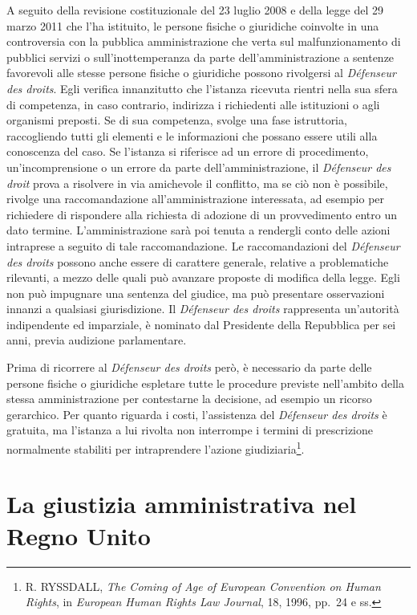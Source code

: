 \documentclass[12pt,it,a4paper,]{report}
\begin{document}
A seguito della revisione costituzionale del 23 luglio 2008 e della
legge del 29 marzo 2011 che l'ha istituito, le persone fisiche o
giuridiche coinvolte in una controversia con la pubblica amministrazione
che verta sul malfunzionamento di pubblici servizi o sull'inottemperanza
da parte dell'amministrazione a sentenze favorevoli alle stesse persone
fisiche o giuridiche possono rivolgersi al \emph{Défenseur des droits}.
Egli verifica innanzitutto che l'istanza ricevuta rientri nella sua
sfera di competenza, in caso contrario, indirizza i richiedenti alle
istituzioni o agli organismi preposti. Se di sua competenza, svolge una
fase istruttoria, raccogliendo tutti gli elementi e le informazioni che
possano essere utili alla conoscenza del caso. Se l'istanza si riferisce
ad un errore di procedimento, un'incomprensione o un errore da parte
dell'amministrazione, il \emph{Défenseur des droit} prova a risolvere in
via amichevole il conflitto, ma se ciò non è possibile, rivolge una
raccomandazione all'amministrazione interessata, ad esempio per
richiedere di rispondere alla richiesta di adozione di un provvedimento
entro un dato termine. L'amministrazione sarà poi tenuta a rendergli
conto delle azioni intraprese a seguito di tale raccomandazione. Le
raccomandazioni del \emph{Défenseur des droits} possono anche essere di
carattere generale, relative a problematiche rilevanti, a mezzo delle
quali può avanzare proposte di modifica della legge. Egli non può
impugnare una sentenza del giudice, ma può presentare osservazioni
innanzi a qualsiasi giurisdizione. Il \emph{Défenseur des droits}
rappresenta un'autorità indipendente ed imparziale, è nominato dal
Presidente della Repubblica per sei anni, previa audizione parlamentare.

Prima di ricorrere al \emph{Défenseur des droits} però, è necessario da
parte delle persone fisiche o giuridiche espletare tutte le procedure
previste nell'ambito della stessa amministrazione per contestarne la
decisione, ad esempio un ricorso gerarchico. Per quanto riguarda i
costi, l'assistenza del \emph{Défenseur des droits} è gratuita, ma
l'istanza a lui rivolta non interrompe i termini di prescrizione
normalmente stabiliti per intraprendere l'azione giudiziaria\footnote{R.
  RYSSDALL, \emph{The Coming of Age of European Convention on Human
  Rights}, in \emph{European Human Rights Law Journal}, 18, 1996, pp.~24
  e ss.}.

\hypertarget{la-giustizia-amministrativa-nel-regno-unito}{%
\chapter{La giustizia amministrativa nel Regno
Unito}\label{la-giustizia-amministrativa-nel-regno-unito}}
\end{document}
